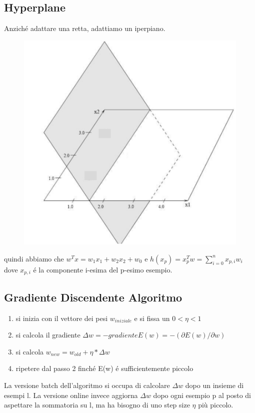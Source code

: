 \documentclass{article}
\begin{document}
\subsection{Hyperplane}
Anziché adattare una retta, adattiamo un iperpiano. 
\begin{figure}[H]
    \centering
    \includegraphics[scale=0.6]{Images/iperpiano.png}
\end{figure}
quindi abbiamo che $w^Tx = w_1x_1 + w_2x_2 + w_0$ e $h(x_p) = x_p^Tw=\sum_{i = 0}^n x_{p,i} w_i$
dove $x_{p,i}$ é la componente i-esima del p-esimo esempio.

\subsection{Gradiente Discendente Algoritmo}
\begin{enumerate}
    \item si inizia con il vettore dei pesi $w_{iniziale}$ e si fissa un $0<\eta <1$
    \item si calcola il gradiente $\Delta w = -gradienteE(w) = -(\partial E(w) / \partial w)$
    \item si calcola $w_{new} = w_{old} + \eta * \Delta w$
    \item ripetere dal passo 2 finché E(w) é sufficientemente piccolo
\end{enumerate}
La versione batch dell'algoritmo si occupa di calcolare $\Delta w$ dopo un insieme di esempi l. La versione online invece aggiorna $\Delta w$ dopo ogni esempio p al posto di aspettare la sommatoria su l, ma ha bisogno di uno step size $\eta$ più piccolo. 
\end{document}
